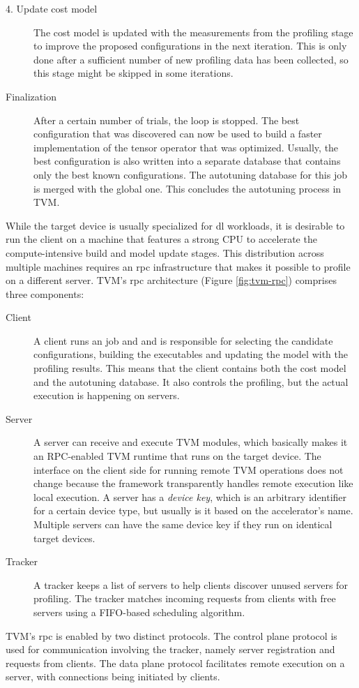 \begin{description}
	\item[4. Update cost model] The cost model is updated with the measurements from the profiling stage to improve the proposed configurations in the next iteration. This is only done after a sufficient number of new profiling data has been collected, so this stage might be skipped in some iterations.
	\item[Finalization] After a certain number of trials, the loop is stopped. The best configuration that was discovered can now be used to build a faster implementation of the tensor operator that was optimized. Usually, the best configuration is also written into a separate database that contains only the best known configurations. The autotuning database for this job is merged with the global one. This concludes the autotuning process in TVM.
\end{description}

While the target device is usually specialized for \gls{dl} workloads, it is desirable to run the client on a machine that features a strong CPU to accelerate the compute-intensive build and model update stages. This distribution across multiple machines requires an \gls{rpc} infrastructure that makes it possible to profile on a different server. TVM's \gls{rpc} architecture (Figure \ref{fig:tvm-rpc}) comprises three components:
\begin{description}
	\item[Client] A client runs an \gls{job} and and is responsible for selecting the candidate configurations, building the executables and updating the model with the profiling results. This means that the client contains both the cost model and the autotuning database. It also controls the profiling, but the actual execution is happening on servers.
	\item[Server] A server can receive and execute TVM modules, which basically makes it an RPC-enabled TVM runtime that runs on the target device. The interface on the client side for running remote TVM operations does not change because the framework transparently handles remote execution like local execution. A server has a \textit{device key}, which is an arbitrary identifier for a certain device type, but usually is it based on the accelerator's name. Multiple servers can have the same device key if they run on identical target devices.
	\item[Tracker] A tracker keeps a list of servers to help clients discover unused servers for profiling. The tracker matches incoming requests from clients with free servers using a FIFO-based scheduling algorithm.
\end{description}
TVM's \gls{rpc} is enabled by two distinct protocols. The control plane protocol is used for communication involving the tracker, namely server registration and requests from clients. The data plane protocol facilitates remote execution on a server, with connections being initiated by clients.

